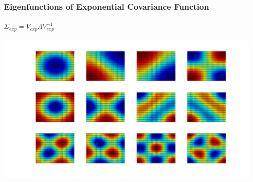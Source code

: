 \documentclass{beamer}
\begin{document}
\begin{frame}
\frametitle{Eigenfunctions of Exponential Covariance Function}
\framesubtitle{$\Sigma_{exp} = V_{exp} \Lambda V_{exp}^{-1}$}
\begin{center}
\includegraphics[width=\textwidth]{Images/recBasis.png}
\end{center}
\end{frame}
\end{document}
